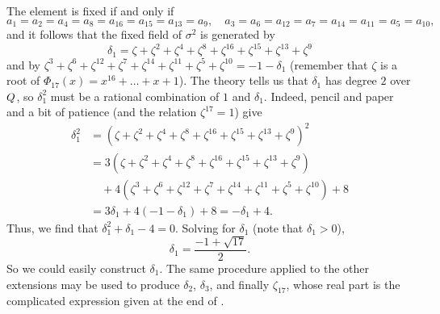 The element is fixed if and only if
\[
  a_1 = a_2 = a_4 = a_8 = a_{16} = a_{15} = a_{13} = a_9,\quad a_3 =
  a_6 = a_{12} = a_7 = a_{14} = a_{11} = a_5 = a_{10},
\]
and it follows that the fixed field of $\sigma^2$ is generated by
\[
  \delta_1 = \zeta + \zeta^2 + \zeta^4 + \zeta^8 + \zeta^{16} +
  \zeta^{15} + \zeta^{13} + \zeta^9
\]
and by
$\zeta^3 + \zeta^6 + \zeta^{12} + \zeta^7 + \zeta^{14} + \zeta^{11} +
\zeta^5 + \zeta^{10} = -1 - \delta_1$ (remember that $\zeta$ is a root
of $\Phi_{17}(x) = x^{16} + \dots + x + 1$).  The theory tells us that
$\delta_1$ has degree $2$ over $Q$, so $\delta_1^2$ must be a
rational combination of $1$ and $\delta_1$. Indeed, pencil and paper
and a bit of patience (and the relation $\zeta^{17} = 1$) give
\begin{align*}
  \delta_1^2 &= (\zeta + \zeta^2 + \zeta^4 + \zeta^8 + \zeta^{16}
               + \zeta^{15} + \zeta^{13} + \zeta^9)^2 \\
             &= 3(\zeta + \zeta^2 + \zeta^4 + \zeta^8 + \zeta^{16} + \zeta^{15}
               + \zeta^{13} + \zeta^9) \\
             &\quad + 4(\zeta^3 + \zeta^6 + \zeta^{12} + \zeta^7 + \zeta^{14}
               + \zeta^{11} + \zeta^5 + \zeta^{10}) + 8 \\
             &= 3\delta_1 + 4(-1 - \delta_1) + 8 = -\delta_1 + 4.
\end{align*}
Thus, we find that $\delta_1^2 + \delta_1 - 4 = 0$. Solving for
$\delta_1$ (note that $\delta_1 > 0$),
\[
  \delta_1 = \frac{-1 + \sqrt{17}}{2}.
\]
So we could easily construct $\delta_1$. The same procedure applied to
the other extensions may be used to produce $\delta_2$, $\delta_3$,
and finally $\zeta_{17}$, whose real part is the complicated
expression given at the end of
.


